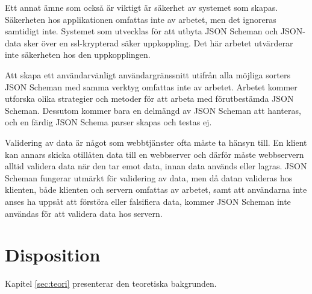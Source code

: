 Ett annat ämne som också är viktigt är säkerhet av systemet som skapas. Säkerheten hos applikationen omfattas inte av arbetet, men det ignoreras samtidigt inte. Systemet som utvecklas för att utbyta JSON Scheman och JSON-data sker över en ssl-krypterad säker uppkoppling. Det här arbetet utvärderar inte säkerheten hos den uppkopplingen.

Att skapa ett användarvänligt användargränssnitt utifrån alla möjliga sorters JSON Scheman med samma verktyg omfattas inte av arbetet. Arbetet kommer utforska olika strategier och metoder för att arbeta med förutbestämda JSON Scheman. Dessutom kommer bara en delmängd av JSON Scheman att hanteras, och en färdig JSON Schema parser skapas och testas ej.

Validering av data är något som webbtjänster ofta måste ta hänsyn till. En klient kan annars skicka otillåten data till en webbserver och därför måste webbservern alltid validera data när den tar emot data, innan data används eller lagras. JSON Scheman fungerar utmärkt för validering av data, men då datan valideras hos klienten, både klienten och servern omfattas av arbetet, samt att användarna inte anses ha uppsåt att förstöra eller falsifiera data, kommer JSON Scheman inte användas för att validera data hos servern.

\section{Disposition}
\label{sec:intro:disposition}
Kapitel \ref{sec:teori} presenterar den teoretiska bakgrunden.

